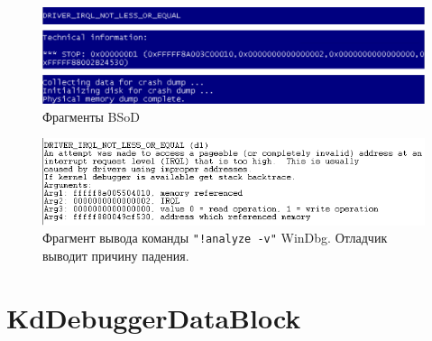 \documentclass{mipt-thesis-bs}
\begin{document}
\begin{figure}[h]
\begin{center}
    \includegraphics[width=1\textwidth]{dump.png}
    \caption{Фрагменты BSoD}
    \label{fig:bsod}
\end{center}
\end{figure}

\begin{figure}[h]
\begin{center}
    \captionsetup{justification=centering}
    \includegraphics{ss1.png}
		\caption{Фрагмент вывода команды \texttt{"!analyze -v"} WinDbg. Отладчик выводит причину падения.}
    \label{fig:windbg-analyze}
\end{center}
\end{figure}

\section*{KdDebuggerDataBlock}
\end{document}
